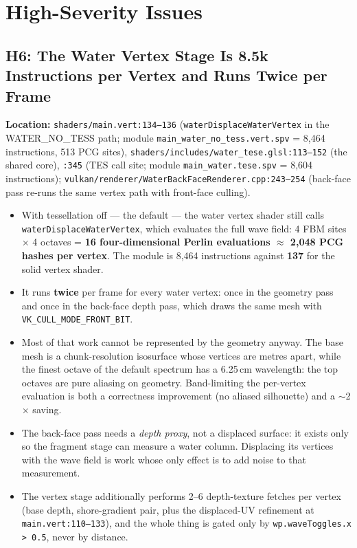 \documentclass[11pt,a4paper]{article}
\begin{document}
\section{High-Severity Issues}

\subsection{H6: The Water Vertex Stage Is 8.5k Instructions per Vertex and Runs Twice per Frame}

\textbf{Location:} \texttt{shaders/main.vert:134--136} (\texttt{waterDisplaceWaterVertex} in the WATER\_NO\_TESS path;
module \texttt{main\_water\_no\_tess.vert.spv} = 8,464 instructions, 513 PCG sites),
\texttt{shaders/includes/water\_tese.glsl:113--152} (the shared core), \texttt{:345} (TES call site; module
\texttt{main\_water.tese.spv} = 8,604 instructions); \texttt{vulkan/renderer/WaterBackFaceRenderer.cpp:243--254}
(back-face pass re-runs the same vertex path with front-face culling).

\begin{itemize}
    \item With tessellation off --- the default --- the water vertex shader still calls
    \texttt{waterDisplaceWaterVertex}, which evaluates the full wave field: 4 FBM sites $\times$ 4 octaves =
    \textbf{16 four-dimensional Perlin evaluations $\approx$ 2,048 PCG hashes per vertex}. The module is 8,464
    instructions against \textbf{137} for the solid vertex shader.
    \item It runs \textbf{twice} per frame for every water vertex: once in the geometry pass and once in the back-face
    depth pass, which draws the same mesh with \texttt{VK\_CULL\_MODE\_FRONT\_BIT}.
    \item Most of that work cannot be represented by the geometry anyway. The base mesh is a chunk-resolution isosurface
    whose vertices are metres apart, while the finest octave of the default spectrum has a 6.25\,cm wavelength: the top
    octaves are pure aliasing on geometry. Band-limiting the per-vertex evaluation is both a correctness improvement
    (no aliased silhouette) and a $\sim$2$\times$ saving.
    \item The back-face pass needs a \emph{depth proxy}, not a displaced surface: it exists only so the fragment stage
    can measure a water column. Displacing its vertices with the wave field is work whose only effect is to add noise to
    that measurement.
    \item The vertex stage additionally performs 2--6 depth-texture fetches per vertex (base depth, shore-gradient pair,
    plus the displaced-UV refinement at \texttt{main.vert:110--133}), and the whole thing is gated only by
    \texttt{wp.waveToggles.x > 0.5}, never by distance.
\end{itemize}
\end{document}
